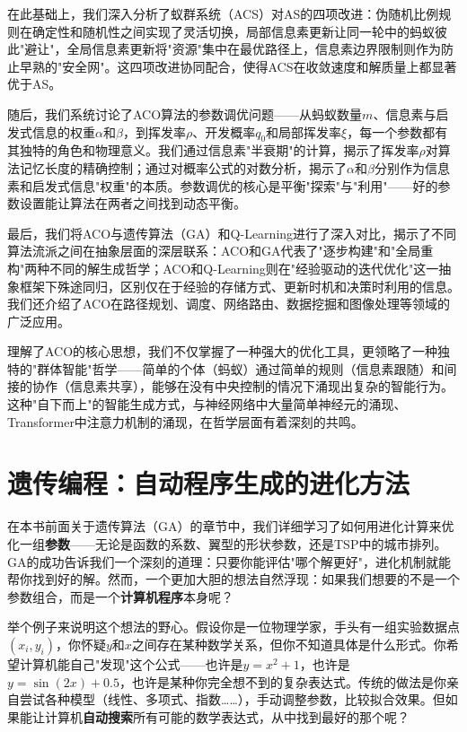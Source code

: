 \documentclass[lang=cn,zihao=-4,a4paper,fontset=windows]{beautybook}
\begin{document}
在此基础上，我们深入分析了蚁群系统（ACS）对AS的四项改进：伪随机比例规则在确定性和随机性之间实现了灵活切换，局部信息素更新让同一轮中的蚂蚁彼此"避让"，全局信息素更新将"资源"集中在最优路径上，信息素边界限制则作为防止早熟的"安全网"。这四项改进协同配合，使得ACS在收敛速度和解质量上都显著优于AS。

随后，我们系统讨论了ACO算法的参数调优问题——从蚂蚁数量$m$、信息素与启发式信息的权重$\alpha$和$\beta$，到挥发率$\rho$、开发概率$q_0$和局部挥发率$\xi$，每一个参数都有其独特的角色和物理意义。我们通过信息素"半衰期"的计算，揭示了挥发率$\rho$对算法记忆长度的精确控制；通过对概率公式的对数分析，揭示了$\alpha$和$\beta$分别作为信息素和启发式信息"权重"的本质。参数调优的核心是平衡"探索"与"利用"——好的参数设置能让算法在两者之间找到动态平衡。

最后，我们将ACO与遗传算法（GA）和Q-Learning进行了深入对比，揭示了不同算法流派之间在抽象层面的深层联系：ACO和GA代表了"逐步构建"和"全局重构"两种不同的解生成哲学；ACO和Q-Learning则在"经验驱动的迭代优化"这一抽象框架下殊途同归，区别仅在于经验的存储方式、更新时机和决策时利用的信息。我们还介绍了ACO在路径规划、调度、网络路由、数据挖掘和图像处理等领域的广泛应用。

理解了ACO的核心思想，我们不仅掌握了一种强大的优化工具，更领略了一种独特的"群体智能"哲学——简单的个体（蚂蚁）通过简单的规则（信息素跟随）和间接的协作（信息素共享），能够在没有中央控制的情况下涌现出复杂的智能行为。这种"自下而上"的智能生成方式，与神经网络中大量简单神经元的涌现、Transformer中注意力机制的涌现，在哲学层面有着深刻的共鸣。

\section{遗传编程：自动程序生成的进化方法}

在本书前面关于遗传算法（GA）的章节中，我们详细学习了如何用进化计算来优化一组\textbf{参数}——无论是函数的系数、翼型的形状参数，还是TSP中的城市排列。GA的成功告诉我们一个深刻的道理：只要你能评估"哪个解更好"，进化机制就能帮你找到好的解。然而，一个更加大胆的想法自然浮现：如果我们想要的不是一个参数组合，而是一个\textbf{计算机程序}本身呢？

举个例子来说明这个想法的野心。假设你是一位物理学家，手头有一组实验数据点$(x_i, y_i)$，你怀疑$y$和$x$之间存在某种数学关系，但你不知道具体是什么形式。你希望计算机能自己"发现"这个公式——也许是$y = x^2 + 1$，也许是$y = \sin(2x) + 0.5$，也许是某种你完全想不到的复杂表达式。传统的做法是你亲自尝试各种模型（线性、多项式、指数……），手动调整参数，比较拟合效果。但如果能让计算机\textbf{自动搜索}所有可能的数学表达式，从中找到最好的那个呢？
\end{document}
